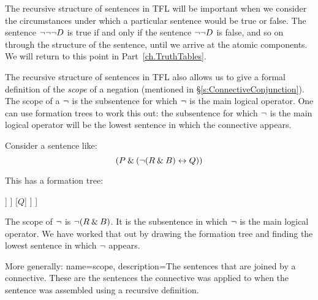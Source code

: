 The recursive structure of sentences in TFL will be important when we consider the circumstances under which a particular sentence would be true or false. The sentence $\neg \neg \neg D$ is true if and only if the sentence $\neg \neg D$ is false, and so on through the structure of the sentence, until we arrive at the atomic components. We will return to this point in Part~\ref{ch.TruthTables}.




The recursive structure of sentences in TFL also allows us to give a formal definition of the \emph{scope} of a negation (mentioned in \S\ref{s:ConnectiveConjunction}). The scope of a $\neg$ is the subsentence for which $\neg$ is the main logical operator. One can use formation trees to work this out: the subsentence for which  $\neg$ is the main logical operator will be the lowest sentence in which the connective appears. 

Consider a sentence like:
$$(P \mathbin{\&} (\neg (R \mathbin{\&} B) \leftrightarrow Q))$$ 

This has a formation tree: 

\begin{center}
	\begin{forest}
[$(P \,\textcolor{leadbeater}{\eand}\,  (\enot (R \eand B) \eiff Q))$
	[$P$]
	[$(\enot (R \eand B) \,\textcolor{leadbeater}{\eiff}\,  Q))$
		[$\textcolor{leadbeater}{\enot}\,   (R \eand B)$
			[$(R\,\textcolor{leadbeater}{\eand}\,   B)$
				[$R$]
				[$B$]
			]
		]
		[$Q$]
	]
]
\end{forest}
\end{center}

The scope of $\neg$ is $\neg (R \mathbin{\&} B)$. It is the subsentence in which $\neg$ is the main logical operator. We have worked that out by drawing the formation tree and finding the lowest sentence in which $\neg$ appears. 


More generally:
{
name=scope,
description={The sentences that are joined by a connective. These are the sentences the connective was applied to when the sentence was assembled using a recursive definition.}
}

